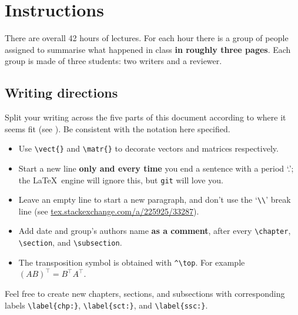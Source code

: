 \chapter*{Instructions}

There are overall 42 hours of lectures.
For each hour there is a group of people assigned to summarise what happened in class \textbf{in roughly three pages}.
Each group is made of three students: two writers and a reviewer.

\section*{Writing directions}

Split your writing across the five parts of this document according to where it seems fit (see ).
Be consistent with the notation here specified.
\begin{itemize}[noitemsep,nolistsep]
\item Use \verb|\vect{}| and \verb|\matr{}| to decorate vectors and matrices respectively.
\item Start a new line \textbf{only and every time} you end a sentence with a period `.'; the \LaTeX\ engine will ignore this, but \verb|git| will love you.
\item Leave an empty line to start a new paragraph, and don't use the `\verb|\\|' break line (see \url{tex.stackexchange.com/a/225925/33287}).
\item Add date and group's authors name \textbf{as a comment}, after every \verb|\chapter|, \verb|\section|, and \verb|\subsection|.
\item The transposition symbol is obtained with \verb|^\top|. For example $(AB)^\top = B^\top A^\top$.
\end{itemize}

Feel free to create new chapters, sections, and subsections with corresponding labels \verb|\label{chp:}|, \verb|\label{sct:}|, and \verb|\label{ssc:}|.

